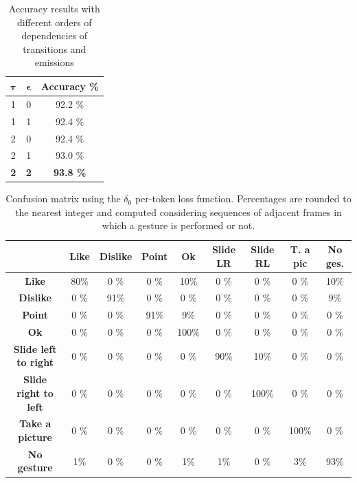 \begin{table}
\begin{center}
\begin{tabular}{|c|c|c|}
\hline
$\mathbf{\tau}$ & $\mathbf{\epsilon}$ & \textbf{Accuracy \%} \\
\hline
\hline
1							& 0							& 92.2 \% \\
1							& 1							& 92.4 \% \\
2							& 0							& 92.4 \% \\
2							& 1							& 93.0 \% \\
\textbf{2}						& \textbf{2}						& \textbf{93.8 \%} \\
\hline
\end{tabular}
\end{center}
\caption{Accuracy results with different orders of dependencies of transitions and emissions}
\label{transemis}
\end{table}

\begin{table}
\begin{center}
\begin{tabular}{|c|c|c|c|c|c|c|c|c|}
\hline
 	& \textbf{Like}	& \textbf{Dislike}	&\textbf{Point}	&\textbf{Ok}	&\textbf{Slide LR}	&\textbf{Slide RL}	&\textbf{T. a pic}	& \textbf{No ges.} \\
\hline
\hline
 \textbf{Like}   & 80\% & 0 \% & 0 \% & 10\% & 0 \% & 0 \% & 0 \% & 10\% \\
\textbf{Dislike}   & 0 \% & 91\% & 0 \% & 0 \% & 0 \% & 0 \% & 0 \% &  9\% \\
\textbf{Point}  & 0 \% & 0 \% & 91\% & 9\% & 0 \% & 0 \% & 0 \% & 0 \% \\
\textbf{Ok}  & 0 \% & 0 \% & 0 \% & 100\% & 0 \% & 0 \% & 0 \% & 0 \% \\
\textbf{Slide left to right}  & 0 \% & 0 \% & 0 \% & 0 \% & 90\% & 10\% & 0 \% & 0 \% \\
\textbf{Slide right to left}  & 0 \% & 0 \% & 0 \% & 0 \% & 0 \% & 100\% & 0 \% & 0 \% \\
\textbf{Take a picture}  & 0 \% & 0 \% & 0 \% & 0 \% & 0 \% & 0 \% & 100\% & 0 \% \\
\textbf{No gesture}   & 1\% & 0 \% & 0 \% & 1\% & 1\% & 0 \% & 3\% & 93\% \\
\hline
\end{tabular}
\end{center}
\caption{Confusion matrix using the $\delta_0$ per-token loss function. Percentages are rounded to the nearest integer and computed considering sequences of adjacent frames in which a gesture is performed or not.}
\label{losses0}
\end{table}

